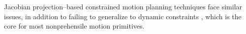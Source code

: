 


Jacobian projection--based constrained motion planning techniques face similar issues, in addition to failing to generalize to dynamic constraints , which is the core for most nonprehensile motion primitives.